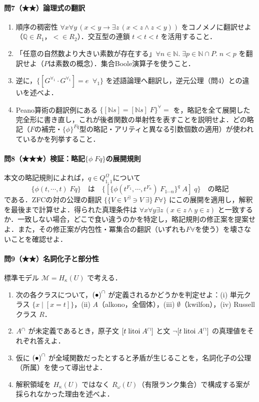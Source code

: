 \documentclass[../../main-detail.tex]{subfiles}
\begin{document}
\paragraph{問7（★★）論理式の翻訳}
\begin{enumerate}[label=(\alph*)]
    \item 順序の稠密性 $\forall x \forall y\, (x < y \to \exists z\, (x < z \land z < y))$ をコノメノに翻訳せよ（$\mathbb{Q} \in R_1$，${<} \in R_2$）．交互型の連鎖 $t < t < t$ を活用すること．
    \item 「任意の自然数より大きい素数が存在する」$\forall n \in \mathbb{N}.\; \exists p \in \mathbb{N} \cap P.\; n < p$ を翻訳せよ（$P$は素数の概念）．集合Boole演算子を使うこと．
    \item 逆に，$\{[G^{\forall_1}\cdot G^{\forall_1}] = e\;\;\forall_1\}$ を述語論理へ翻訳し，逆元公理（問4）との違いを述べよ．
    \item Peano算術の翻訳例にある $\{[\mathbb{N} s] = [\mathbb{N} s]\; F\}^\forall =$ を，略記を全て展開した完全形に書き直し，これが後者関数の単射性を表すことを説明せよ．どの略記（$F$の補完・$\{\phi\}^{Fq}$型の略記・アリティと異なる引数個数の適用）が使われているかを列挙すること．
\end{enumerate}

\paragraph{問8（★★★）検証：略記$\{\phi\; Fq\}$の展開規則}
本文の略記規則によれば，$q\in Q^\Omega_{1,1}$について
\[
    \{\phi(t,\cdots,t)\; Fq\} \quad\text{は}\quad \{[\{\phi(t^{F_1},\cdots,t^{F_n})\; F_{1\cdots n}\}^q\; A]\; q\} \quad\text{の略記}
\]
である．ZFCの対の公理の翻訳 $\{\{V \in V^{\exists} \ni V\; \exists\}\,F\forall\}$ にこの展開を適用し，解釈を最後まで計算せよ．得られた真理条件は $\forall x \forall y \exists z\, (x \in z \land y \in z)$ と一致するか．一致しない場合，どこで食い違うのかを特定し，略記規則の修正案を提案せよ．また，その修正案が内包性・冪集合の翻訳（いずれも$F\forall$を使う）を壊さないことを確認せよ．

\paragraph{問9（★★）名詞化子と部分性}
標準モデル $\mathcal{M} = H_\kappa(U)$ で考える．
\begin{enumerate}[label=(\alph*)]
    \item 次の各クラスについて，${{(\bullet)}^\cap}$ が定義されるかどうかを判定せよ：(i) 単元クラス $\{x \mid [x = t]\}$，(ii) $A$（alkono，全個体），(iii) $\emptyset$（kwilfon），(iv) Russellクラス $R$．
    \item ${{A}^\cap}$ が未定義であるとき，原子文 $[t\; \text{litoi}\; {{A}^\cap}]$ と文 $\lnot[t\; \text{litoi}\; {{A}^\cap}]$ の真理値をそれぞれ答えよ．
    \item 仮に ${{(\bullet)}^\cap}$ が全域関数だったとすると矛盾が生じることを，名詞化子の公理（所属）を使って導出せよ．
    \item 解釈領域を $H_\kappa(U)$ ではなく $R_\omega(U)$（有限ランク集合）で構成する案が採られなかった理由を述べよ．
\end{enumerate}
\end{document}

